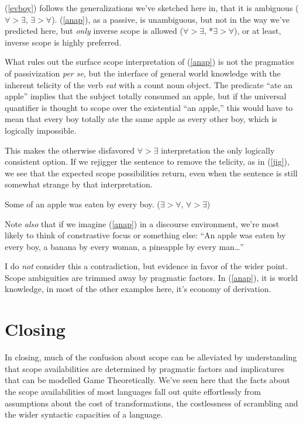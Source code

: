 \documentclass{article}
\begin{document}
(\ref{evboy}) follows the generalizations we've sketched here in, that it is ambiguous ($\forall>\exists$, $\exists>\forall$). (\ref{anap}), as a passive, is unambiguous, but not in the way we've predicted here, but \emph{only} inverse scope is allowed ($\forall>\exists$, *$\exists>\forall$), or at least, inverse scope is highly preferred.


What rules out the surface scope interpretation of (\ref{anap}) is not the pragmatics of passivization \emph{per se}, but the interface of general world knowledge with the inherent telicity of the verb \emph{eat} with a count noun object. The predicate ``ate an apple'' implies that the subject totally consumed an apple, but if the universal quantifier is thought to scope over the existential ``an apple,'' this would have to mean that every boy totally ate the same apple as every other boy, which is logically impossible.

This makes the otherwise disfavored $\forall>\exists$ interpretation the only logically consistent option. If we rejigger the sentence to remove the telicity, as in (\ref{jig}), we see that the expected scope possibilities return, even when the sentence is still somewhat strange by that interpretation.

\begin{exe}
\ex Some of an apple was eaten by every boy. \hfill ($\exists>\forall$, $\forall>\exists$)\label{jig}
\end{exe}

Note \emph{also} that if we imagine (\ref{anap}) in a discourse environment, we're most likely to think of constrastive focus or something else: ``An apple was eaten by every boy, a banana by every woman, a pineapple by every man\ldots'' 

I do \emph{not} consider this a contradiction, but evidence in favor of the wider point. Scope ambiguities are trimmed away by pragmatic factors. In (\ref{anap}), it is world knowledge, in most of the other examples here, it's economy of derivation.

\section{Closing}

In closing, much of the confusion about scope can be alleviated by understanding that scope availabilities are determined by pragmatic factors and implicatures that can be modelled Game Theoretically. We've seen here that the facts about the scope availabilities of most languages fall out quite effortlessly from assumptions about the cost of transformations, the costlessness of scrambling and the wider syntactic capacities of a language.
\end{document}
